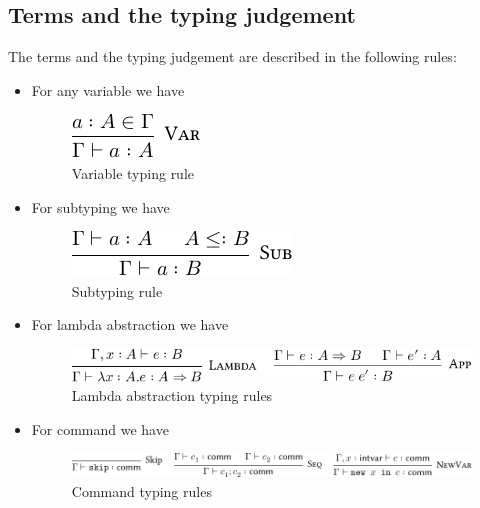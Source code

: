 \documentclass[12pt,a4paper]{report}
\theoremstyle{definition}
\begin{document}
        \subsection{Terms and the typing judgement} \label{subsec: terms}
        The terms and the typing judgement are described in the following rules:
        \begin{itemize}
            \item For any variable we have 
                \begin{figure}[H]
                    \centering
                    \includegraphics{source_terms_var.pdf}
                    \caption{Variable typing rule}
                    \label{fig: rule_var}
                \end{figure}
            \item For subtyping we have
                \begin{figure}[H]
                    \centering
                    \includegraphics{source_terms_subtype.pdf}
                    \caption{Subtyping rule}
                    \label{fig: rule_subtype}
                \end{figure}
            \item For lambda abstraction we have
                \begin{figure}[H]
                    \centering
                    \includegraphics{source_terms_lambda.pdf}
                    \caption{Lambda abstraction typing rules}
                    \label{fig: rule_lambda}
                \end{figure}
            \item For command we have
                \begin{figure}[H]
                    \centering
                    \includegraphics{source_terms_comm.pdf}
                    \caption{Command typing rules}

\end{figure}
\end{itemize}
\end{document}
